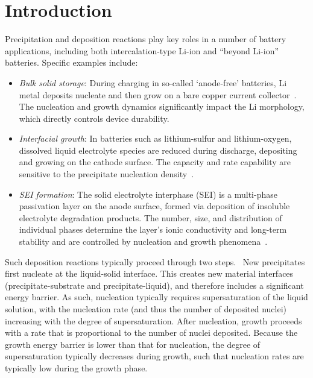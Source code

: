 \documentclass[final,3p,times,twocolumn, 12pt]{elsarticle}
\begin{document}
\section{Introduction}
Precipitation and deposition reactions play key roles in a number of battery applications, including both intercalation-type Li-ion  and ``beyond Li-ion'' batteries. Specific examples include:
    \begin{itemize}
        \item \textit{Bulk solid storage}: During charging in so-called `anode-free' batteries, Li metal deposits nucleate and then grow on a bare copper current collector~\cite{bib:Li-Cu_deposition}. The nucleation and growth dynamics significantly impact the Li morphology, which directly controls device durability. \cite{bib:PSD_effects_Li,bib:PSD_effects_Li_2,bib:PSD_effects_Li_3,bib:PSD_effects_Li_4,bib:Model_ex_1}
        
        \item \textit{Interfacial growth}: In batteries such as lithium-sulfur and lithium-oxygen, dissolved liquid electrolyte species are reduced during discharge, depositing and growing on the cathode surface. The capacity and rate capability are sensitive to the precipitate nucleation density~\cite{bib:Li-S_deposition,bib:Li-S_deposition_2,bib:Li-O_deposition,bib:Li-air_deposition,bib:Model_ex_2,bib:Model_ex_8}.
               
        \item \textit{SEI formation}: The solid electrolyte interphase (SEI) is a multi-phase passivation layer on the anode surface, formed via deposition of insoluble electrolyte degradation products. The number, size, and distribution of individual phases determine the layer's ionic conductivity and long-term stability and are controlled by nucleation and growth phenomena~\cite{bib:SEI_deposition,bib:SEI_deposition_2,bib:SEI_deposition_3}.
    \end{itemize}

Such deposition reactions typically proceed through two steps.~\cite{bib:classic_nuc_theory} New precipitates first nucleate at the liquid-solid interface. This creates new material interfaces (precipitate-substrate and precipitate-liquid), and therefore includes a significant energy barrier\cite{bib:Model_ex_2}. As such, nucleation typically requires supersaturation of the liquid solution, with the nucleation rate (and thus the number of deposited nuclei) increasing with the degree of supersaturation\cite{bib:supersat}.  After nucleation, growth proceeds with a rate that is proportional to the number of nuclei deposited. Because the growth energy barrier is lower than that for nucleation, the degree of supersaturation typically decreases  during growth, such that nucleation rates are typically low during the growth phase\cite{bib:Li-Cu_deposition}.
\end{document}
